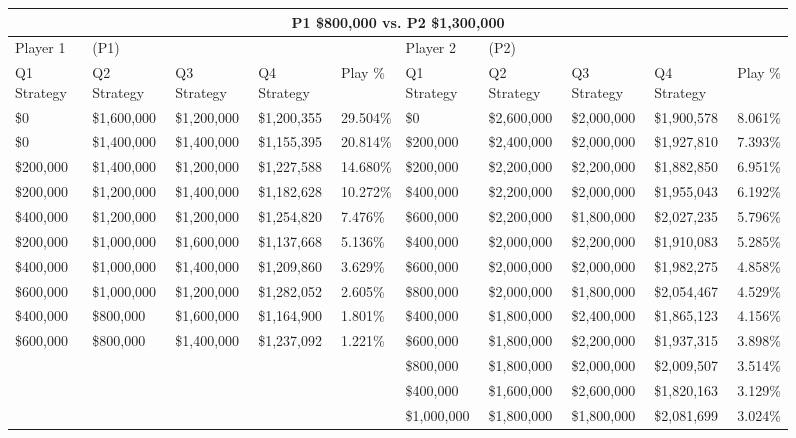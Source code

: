 \documentclass[11pt]{article}
\begin{document}
\begin{figure}
\tiny
\begin{tabular}{ |p{1.0cm}p{1.0cm}p{1.0cm}p{2.0cm}|p{1.0cm}||p{1.0cm}p{1.0cm}p{1.0cm}p{2.0cm}|p{1.0cm}|}
\hline
\multicolumn{10}{|c|}{P1 \$800,000 vs. P2 \$1,300,000} \\
\hline
Player 1 & (P1) & & & & Player 2 & (P2) & & & \\
\hline
Q1 Strategy & Q2 Strategy & Q3 Strategy & Q4 Strategy  &  Play \% & Q1 Strategy & Q2 Strategy & Q3 Strategy & Q4 Strategy  &  Play \%\\
\hline
\$0 & \$1,600,000 & \$1,200,000 & \$1,200,355 & 29.504\% & \$0 & \$2,600,000 & \$2,000,000 & \$1,900,578 & 8.061\% \\
\$0 & \$1,400,000 & \$1,400,000 & \$1,155,395 & 20.814\% & \$200,000 & \$2,400,000 & \$2,000,000 & \$1,927,810 & 7.393\% \\
\$200,000 & \$1,400,000 & \$1,200,000 & \$1,227,588 & 14.680\% & \$200,000 & \$2,200,000 & \$2,200,000 & \$1,882,850 & 6.951\% \\
\$200,000 & \$1,200,000 & \$1,400,000 & \$1,182,628 & 10.272\% & \$400,000 & \$2,200,000 & \$2,000,000 & \$1,955,043 & 6.192\% \\
\$400,000 & \$1,200,000 & \$1,200,000 & \$1,254,820 & 7.476\% & \$600,000 & \$2,200,000 & \$1,800,000 & \$2,027,235 & 5.796\% \\
\$200,000 & \$1,000,000 & \$1,600,000 & \$1,137,668 & 5.136\% & \$400,000 & \$2,000,000 & \$2,200,000 & \$1,910,083 & 5.285\% \\
\$400,000 & \$1,000,000 & \$1,400,000 & \$1,209,860 & 3.629\% & \$600,000 & \$2,000,000 & \$2,000,000 & \$1,982,275 & 4.858\% \\
\$600,000 & \$1,000,000 & \$1,200,000 & \$1,282,052 & 2.605\% & \$800,000 & \$2,000,000 & \$1,800,000 & \$2,054,467 & 4.529\% \\
\$400,000 & \$800,000 & \$1,600,000 & \$1,164,900 & 1.801\% & \$400,000 & \$1,800,000 & \$2,400,000 & \$1,865,123 & 4.156\% \\
\$600,000 & \$800,000 & \$1,400,000 & \$1,237,092 & 1.221\% & \$600,000 & \$1,800,000 & \$2,200,000 & \$1,937,315 & 3.898\% \\
&&&& & \$800,000 & \$1,800,000 & \$2,000,000 & \$2,009,507 & 3.514\% \\
&&&& & \$400,000 & \$1,600,000 & \$2,600,000 & \$1,820,163 & 3.129\% \\
&&&& & \$1,000,000 & \$1,800,000 & \$1,800,000 & \$2,081,699 & 3.024\% \\

\end{tabular}
\end{figure}
\end{document}
